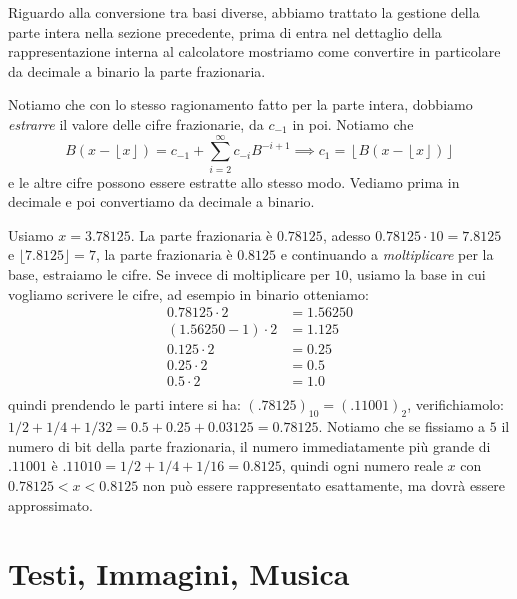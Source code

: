 Riguardo alla conversione tra basi diverse, abbiamo trattato la gestione della
parte intera nella sezione precedente, prima di entra nel dettaglio della
rappresentazione interna al calcolatore mostriamo come convertire in
particolare da decimale a binario la parte frazionaria.

Notiamo che con lo stesso ragionamento fatto per la parte intera, dobbiamo
\emph{estrarre} il valore delle cifre frazionarie, da $c_{-1}$ in poi. 
Notiamo che \[
B(x - \left\lfloor x \right \rfloor) = c_{-1} + \sum_{i=2}^{\infty} c_{-i}B^{-i+1}
\implies c_1 = \left\lfloor B(x - \left\lfloor x \right\rfloor) \right\rfloor \]
e le altre cifre possono essere estratte allo stesso modo. Vediamo prima in
decimale e poi convertiamo da decimale a binario.

\begin{ex} Usiamo $x = 3.78125$. La parte frazionaria è $0.78125$, adesso
$0.78125\cdot 10 = 7.8125$ e $\lfloor 7.8125 \rfloor = 7$, la parte frazionaria
è $0.8125$ e continuando a \emph{moltiplicare} per la base, estraiamo le cifre.
Se invece di moltiplicare per $10$, usiamo la base in cui vogliamo scrivere le
cifre, ad esempio in binario otteniamo:
\begin{align*}
		 0.78125 \cdot 2 &= 1.56250\\
		 (1.56250-1) \cdot 2 &= 1.125\\
		 0.125 \cdot 2 &= 0.25\\
		 0.25  \cdot 2 &= 0.5\\
		 0.5 \cdot 2 &= 1.0\\
\end{align*}
quindi prendendo le parti intere si ha: $(.78125)_{10} = (.11001)_2$, verifichiamolo: $1/2+1/4+1/32 = 0.5 + 0.25 + 0.03125 = 0.78125$. Notiamo che se fissiamo a $5$ il numero di bit della parte frazionaria, il numero immediatamente più grande di $.11001$ è $.11010 = 1/2 + 1/4 + 1/16 = 0.8125$, quindi ogni numero reale $x$ con $0.78125  < x < 0.8125$ non può essere rappresentato esattamente, ma dovrà essere approssimato.
\end{ex}

\section{Testi, Immagini, Musica}
